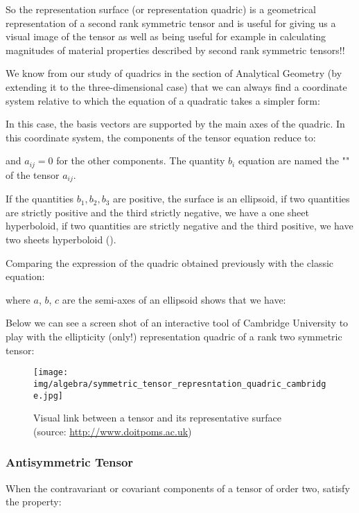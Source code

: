 	So the representation surface (or representation quadric) is a geometrical representation of a second rank symmetric tensor and is useful for giving us a visual image of the tensor as well as being useful for example in calculating magnitudes of material properties described by second rank symmetric tensors!!
	
	We know from our study of quadrics in the section of Analytical Geometry (by extending it to the three-dimensional case) that we can always find a coordinate system relative to which the equation of a quadratic takes a simpler form:
	
	In this case, the basis vectors are supported by the main axes of the quadric. In this coordinate system, the components of the tensor equation reduce to:
	
	and $a_{ij}=0$ for the other components. The quantity $b_i$ equation are named the "" of the tensor $a_{ij}$.

	If the quantities $b_1,b_2,b_3$ are positive, the surface is an ellipsoid, if two quantities are strictly positive and the third strictly negative, we have a one sheet hyperboloid, if two quantities are strictly negative and the third positive, we have two sheets hyperboloid ().
	
	Comparing the expression of the quadric obtained previously with the classic equation:
	
	where $a$, $b$, $c$ are the semi-axes of an ellipsoid shows that we have:
	
	Below we can see a screen shot of an interactive tool of Cambridge University to play with the ellipticity (only!) representation quadric of a rank two symmetric tensor:
	\begin{figure}[H]
		\centering
		\texttt{[image: img/algebra/symmetric\_tensor\_represntation\_quadric\_cambridge.jpg]}
		\caption[Visual link between a tensor and its representative surface]{Visual link between a tensor and its representative surface \\(source: \href{http://www.doitpoms.ac.uk/tlplib/tensors/representation.php}{http://www.doitpoms.ac.uk})}
	\end{figure}
	
	\subsubsection{Antisymmetric Tensor}
	When the contravariant or covariant components of a tensor of order two, satisfy the property:
	
